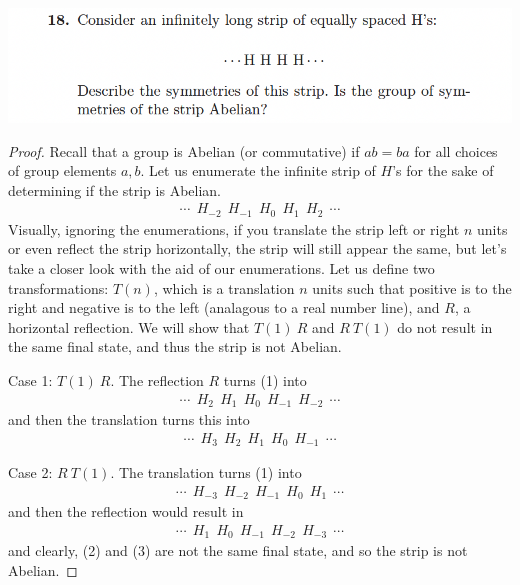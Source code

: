 \documentclass[12pt]{scrartcl}
\begin{document}
\newpage 

\includegraphics[width=14cm]{18.png}

\begin{proof}
  Recall that a group is Abelian (or commutative) if $ab = ba$ for all choices of 
  group elements $a, b$. Let us enumerate the infinite strip of $H$'s for the sake of determining if the strip is Abelian.
  \begin{align}
    \cdots \ \ H_{-2} \ \ H_{-1} \ \ H_0 \ \ H_1 \ \ H_2 \ \ \cdots
  \end{align}
  Visually, ignoring the enumerations, if you translate the strip left or right $n$ units or even reflect 
  the strip horizontally, the strip will still appear the same, but let's take a closer look with the aid of 
  our enumerations. Let us define two transformations: $T(n)$, which is a translation $n$ units such that positive is to the right 
  and negative is to the left (analagous to a real number line), and $R$, a horizontal reflection. We will show that 
  $T(1) \ R$ and $R \ T(1)$ do not result in the same final state, and thus the strip is not Abelian. 

  \hfill

  Case 1: $T(1) \ R$. The reflection $R$ turns (1) into 
  \begin{align*}
    \cdots \ \ H_{2} \ \ H_{1} \ \ H_0 \ \ H_{-1} \ \ H_{-2} \ \ \cdots
  \end{align*}
  and then the translation turns this into 
  \begin{align}
    \cdots \ \ H_{3} \ \ H_{2} \ \ H_1 \ \ H_{0} \ \ H_{-1} \ \ \cdots
  \end{align}

  \hfill

  Case 2: $R \ T(1)$. The translation turns (1) into 
  \begin{align*}
    \cdots \ \ H_{-3} \ \ H_{-2} \ \ H_{-1} \ \ H_0 \ \ H_1 \ \ \cdots
  \end{align*}
  and then the reflection would result in
  \begin{align}
    \cdots \ \ H_{1} \ \ H_{0} \ \ H_{-1} \ \ H_{-2} \ \ H_{-3} \ \ \cdots
  \end{align}
  and clearly, (2) and (3) are not the same final state, and so the strip is not Abelian.
\end{proof}
\end{document}
